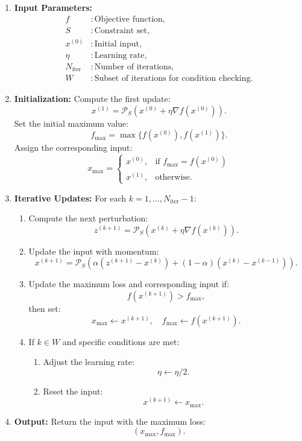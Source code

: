 \begin{enumerate}
    \item \textbf{Input Parameters:}  
    \begin{align*}
    f &: \text{Objective function}, \\
    S &: \text{Constraint set}, \\
    x^{(0)} &: \text{Initial input}, \\
    \eta &: \text{Learning rate}, \\
    N_{\text{iter}} &: \text{Number of iterations}, \\
    W &: \text{Subset of iterations for condition checking}.
    \end{align*}

    \item \textbf{Initialization:}  
    Compute the first update:  
    \[
    x^{(1)} = \mathcal{P}_S \left( x^{(0)} + \eta \nabla f(x^{(0)}) \right).
    \]
    Set the initial maximum value:  
    \[
    f_{\text{max}} = \max \{f(x^{(0)}), f(x^{(1)})\}.
    \]
    Assign the corresponding input:  
    \[
    x_{\text{max}} = 
    \begin{cases} 
    x^{(0)}, & \text{if } f_{\text{max}} = f(x^{(0)}) \\
    x^{(1)}, & \text{otherwise}.
    \end{cases}
    \]

    \item \textbf{Iterative Updates:}  
    For each $k = 1, \dots, N_{\text{iter}} - 1$:
    \begin{enumerate}
        \item Compute the next perturbation:  
        \[
        z^{(k+1)} = \mathcal{P}_S \left( x^{(k)} + \eta \nabla f(x^{(k)}) \right).
        \]
        \item Update the input with momentum:  
        \[
        x^{(k+1)} = \mathcal{P}_S \left( \alpha (z^{(k+1)} - x^{(k)}) + (1 - \alpha)(x^{(k)} - x^{(k-1)}) \right).
        \]
        \item Update the maximum loss and corresponding input if:  
        \[
        f(x^{(k+1)}) > f_{\text{max}},
        \]
        then set:  
        \[
        x_{\text{max}} \gets x^{(k+1)}, \quad f_{\text{max}} \gets f(x^{(k+1)}).
        \]
        \item If $k \in W$ and specific conditions are met:
        \begin{enumerate}
            \item Adjust the learning rate:  
            \[
            \eta \gets \eta / 2.
            \]
            \item Reset the input:  
            \[
            x^{(k+1)} \gets x_{\text{max}}.
            \]
        \end{enumerate}
    \end{enumerate}

    \item \textbf{Output:}  
    Return the input with the maximum loss:
    \[
    (x_{\text{max}}, f_{\text{max}}).
    \]
\end{enumerate}

